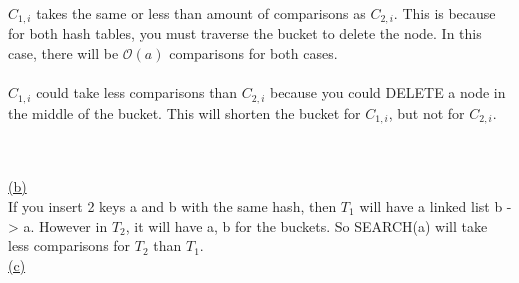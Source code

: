 \documentclass[12pt]{article}
\newcommand{\code}[1]{{\ttfamily \fontseries{b}\selectfont #1}}
\def \calO {\mathcal{O}}
\newenvironment{proofindent}{\vspace*{2mm}\hfill\begin{minipage}{\dimexpr\textwidth-10mm}}{\end{minipage}}
\begin{document}
\begin{proofindent}
	$C_{1,i}$ takes the same or less than amount of comparisons as $C_{2,i}$. This is because for both hash tables, you must traverse the bucket to delete the node. In this case, there will be $\calO(a)$ comparisons for both cases.
	\\\\
	$C_{1,i}$ could take less comparisons than $C_{2,i}$ because you could \code{DELETE} a node in the middle of the bucket. This will shorten the bucket for $C_{1,i}$, but not for $C_{2,i}$.
\end{proofindent}
\ \\\\
\noindent \hyperlink{toc}{\hypertarget{4.2}{(b)}}\\
If you insert 2 keys \code{a} and \code{b} with the same hash, then $T_1$ will have a linked list \code{b -> a}. However in $T_2$, it will have \code{a, b} for the buckets. So \code{SEARCH(a)} will take less comparisons for $T_2$ than $T_1$.\\

\noindent \hyperlink{toc}{\hypertarget{4.3}{(c)}}\\
\end{document}
